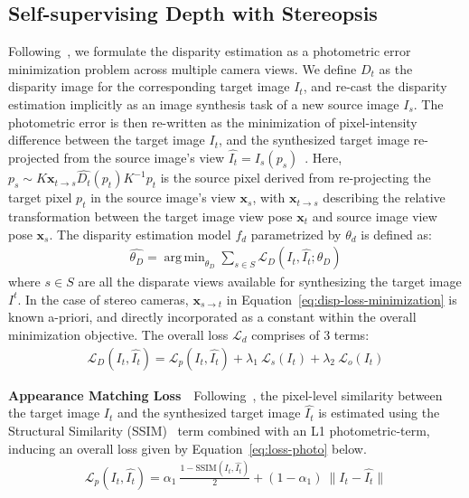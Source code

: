 \documentclass[letterpaper, 10 pt, conference]{ieeeconf}  \IEEEoverridecommandlockouts
\DeclareMathOperator*{\argmin}{arg\,min}
\begin{document}
 \subsection{Self-supervising Depth with Stereopsis}  
\label{sec:proc-ssl-depth}
Following~\cite{godard2017unsupervised,garg2016unsupervised,zhou2017unsupervised}, we formulate the disparity estimation as a photometric error minimization problem across multiple camera views. We define $D_t$ as the disparity image for the corresponding target image $I_t$, and re-cast the disparity estimation implicitly as an image synthesis task of a new source image $I_s$. The photometric error is then re-written as the minimization of pixel-intensity difference between the target image $I_t$, and the synthesized target image re-projected from the source image's view $\hat{I_t} = I_s(p_s)$~\cite{jaderberg2015spatial}. Here, $p_s \sim K \mathbf{x}_{t \to s}  \hat{D_t}(p_t) K^{-1} p_t$ is the source pixel derived from re-projecting the target pixel $p_t$ in the source image's view $\mathbf{x}_s$, with $\mathbf{x}_{t \to s}$ describing the relative transformation between the target image view pose $\mathbf{x}_t$ and source image view pose $\mathbf{x}_s$. The disparity estimation model $f_d$ parametrized by $\theta_d$ is defined as: 
\begin{align}
  \hat{\theta_D} = \argmin_{\theta_D} \sum_{s \in S} \mathcal{L}_{D}(I_t, \hat{I_t}; \theta_D)
  \label{eq:disp-loss-minimization}
\end{align}
where $s \in S$ are all the disparate views available for synthesizing the target image $I^t$. In the case of stereo cameras, $\mathbf{x}_{s \to t}$ in Equation~\ref{eq:disp-loss-minimization} is known a-priori, and directly incorporated as a constant within the overall minimization objective. The overall loss $\mathcal{L}_d$ comprises of 3 terms: 
\begin{align}
  \mathcal{L}_{D}(I_t,\hat{I_t}) = \mathcal{L}_p(I_t,\hat{I_t}) + \lambda_1~\mathcal{L}_s(I_t) + \lambda_2~\mathcal{L}_o(I_t)
  \label{eq:overall-loss-disp}
\end{align}




\textbf{Appearance Matching Loss}~~Following~\cite{godard2017unsupervised}, the pixel-level similarity between the target image $I_t$ and the synthesized target image $\hat{I_t}$ is estimated using the Structural Similarity (SSIM)~\cite{wang2004image} term combined with an L1 photometric-term, inducing an overall loss given by Equation~\ref{eq:loss-photo} below.   
\begin{align}
  \mathcal{L}_{p}(I_t,\hat{I_t}) = \alpha_1~\frac{1 - \text{SSIM}(I_t,\hat{I_t})}{2} + (1-\alpha_1)~\| I_t - \hat{I_t} \|
  \label{eq:loss-photo}
\end{align}
\end{document}
